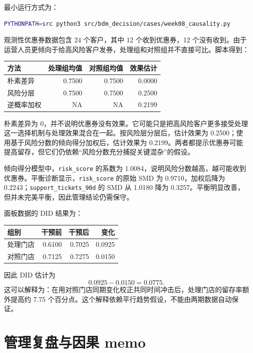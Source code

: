 \documentclass[UTF8,fontset=fandol,openany,zihao=-4]{ctexbook}
\begin{document}
最小运行方式为：
\begin{lstlisting}[language=bash,caption={运行第8周因果推断案例}]
PYTHONPATH=src python3 src/bdm_decision/cases/week08_causality.py
\end{lstlisting}

观测性优惠券数据包含 24 个客户，其中 12 个收到优惠券，12 个没有收到。由于运营人员更倾向于给高风险客户发券，处理组和对照组并不直接可比。脚本得到：
\begin{center}
\begin{tabular}{lrrr}
\toprule
方法 & 处理组均值 & 对照组均值 & 效果估计\\
\midrule
朴素差异 & 0.7500 & 0.7500 & 0.0000\\
风险分层 & 0.7500 & 0.7500 & 0.2500\\
逆概率加权 & NA & NA & 0.2199\\
\bottomrule
\end{tabular}
\end{center}

朴素差异为 0，并不说明优惠券没有效果。它可能只是把高风险客户更多接受处理这一选择机制与处理效果混合在一起。按风险层分层后，估计效果为 0.2500；使用基于风险分数的倾向得分加权后，估计效果为 0.2199。两者都提示优惠券可能提高留存，但它们仍依赖“风险分数充分捕捉关键混杂”的假设。

倾向得分模型中，\texttt{risk\_score} 的系数为 1.0084，说明风险分数越高，越可能收到优惠券。平衡诊断显示，\texttt{risk\_score} 的原始 SMD 为 0.9710，加权后降为 0.2243；\texttt{support\_tickets\_90d} 的 SMD 从 1.0180 降为 0.3257。平衡明显改善，但并未完美平衡，因此管理结论仍需保守。

面板数据的 DID 结果为：
\begin{center}
\begin{tabular}{lrrr}
\toprule
组别 & 干预前 & 干预后 & 变化\\
\midrule
处理门店 & 0.6100 & 0.7025 & 0.0925\\
对照门店 & 0.7125 & 0.7275 & 0.0150\\
\bottomrule
\end{tabular}
\end{center}
因此 DID 估计为
\[
  0.0925-0.0150=0.0775.
\]
这可以解释为：在用对照门店同期变化校正共同时间冲击后，处理门店的留存率额外提高约 7.75 个百分点。这个解释依赖平行趋势假设，不能由两期数据自动保证。

\section{管理复盘与因果 memo}
\end{document}
